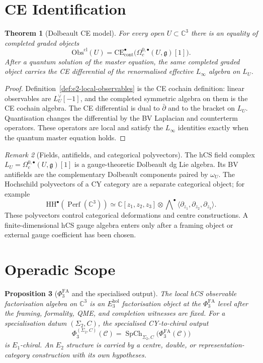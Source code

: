 \documentclass[11pt]{amsart}
\providecommand{\C}{\mathbb{C}}
\providecommand{\dbar}{\bar{\partial}}
\providecommand{\g}{\mathfrak{g}}
\providecommand{\Obs}{\mathrm{Obs}}
\providecommand{\CE}{\mathrm{CE}}
\providecommand{\HH}{\mathrm{HH}}
\providecommand{\PhiFA}{\Phi^{\mathrm{FA}}}
\providecommand{\SpCh}{\operatorname{SpCh}}
\theoremstyle{plain}
\newtheorem{theorem}{Theorem}[section]
\newtheorem{proposition}[theorem]{Proposition}
\theoremstyle{definition}
\theoremstyle{remark}
\newtheorem{remark}[theorem]{Remark}
\begin{document}
\section{CE Identification}

\begin{theorem}[Dolbeault CE model]\label{thm:e2-dolbeault-ce}
For every open $U\subset\C^3$ there is an equality of completed graded
objects
\[
 \Obs^{\mathrm{cl}}(U)
 =
 \CE^\bullet_{\mathrm{cont}}\bigl(\Omega_c^{0,\bullet}(U,\g)[1]\bigr).
\]
After a quantum solution of the master equation, the same completed
graded object carries the CE differential of the renormalised effective
$L_\infty$ algebra on $L_U$.
\end{theorem}

\begin{proof}
Definition~\ref{def:e2-local-observables} is the CE cochain definition:
linear observables are $L_U^\vee[-1]$, and the completed symmetric
algebra on them is the CE cochain algebra. The CE differential is dual
to $\dbar$ and to the bracket on $L_U$. Quantisation changes the
differential by the BV Laplacian and counterterm operators. These
operators are local and satisfy the $L_\infty$ identities exactly when
the quantum master equation holds.
\end{proof}

\begin{remark}[Fields, antifields, and categorical polyvectors]\label{rem:e2-separation}
The hCS field complex \(L_U=\Omega_c^{0,\bullet}(U,\g)[1]\) is a
gauge-theoretic Dolbeault dg Lie algebra. Its BV antifields are the
complementary Dolbeault components paired by \(\omega_U\). The
Hochschild polyvectors of a CY category are a separate categorical
object; for example
\[
 \HH^\bullet(\operatorname{Perf}(\C^3))
 \simeq
 \C[z_1,z_2,z_3]\otimes
 \bigwedge\nolimits^\bullet
 \langle\partial_{z_1},\partial_{z_2},\partial_{z_3}\rangle .
\]
These polyvectors control categorical deformations and centre
constructions. A finite-dimensional hCS gauge algebra enters only after
a framing object or external gauge coefficient has been chosen.
\end{remark}

\section{Operadic Scope}

\begin{proposition}[\(\PhiFA_3\) and the specialised output]\label{prop:e2-operadic-scope}
The local hCS observable factorisation algebra on \(\C^3\) is an
\(E_3^{\mathrm{hol}}\) factorisation object at the \(\PhiFA_3\) level
after the framing, formality, QME, and completion witnesses are fixed.
For a specialisation datum \((\Sigma_2,C)\), the specialised
CY-to-chiral output
\[
 \Phi_3^{(\Sigma_2,C)}(\mathcal C)
 =
 \SpCh_{\Sigma_2,C}\bigl(\PhiFA_3(\mathcal C)\bigr)
\]
is \(E_1\)-chiral. An \(E_2\) structure is carried by a centre, double,
or representation-category construction with its own hypotheses.
\end{proposition}
\end{document}
